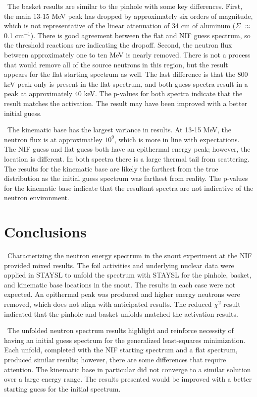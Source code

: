 \documentclass[journal]{IEEEtran}
\begin{document}
	\ The basket results are similar to the pinhole with some key differences. 
First, the main 13-15 MeV peak has dropped by approximately six orders of magnitude, which is not representative of the linear attenuation of 34 cm of aluminum ($\Sigma$ $\approx$ 0.1 cm$^{-1}$). 
There is good agreement between the flat and NIF guess spectrum, so the threshold reactions are indicating the dropoff. 
Second, the neutron flux between approximately one to ten MeV is nearly removed. 
There is not a process that would remove all of the source neutrons in this region, but the result appears for the flat starting spectrum as well. 
The last difference is that the 800 keV peak only is present in the flat spectrum, and both guess spectra result in a peak at approximately 40 keV. 
The p-values for both spectra indicate that the result matches the activation. 
The result may have been improved with a better initial guess. 
	
	\ The kinematic base has the largest variance in results. 
At 13-15 MeV, the neutron flux is at approximatley $10^{9}$, which is more in line with expectations. 
The NIF guess and flat guess both have an epithermal energy peak; however, the location is different. 
In both spectra there is a large thermal tail from scattering. 
The results for the kinematic base are likely the farthest from the true distribution as the initial guess spectrum was farthest from reality. 
The p-values for the kinematic base indicate that the resultant spectra are not indicative of the neutron environment. 
	 
	\section{Conclusions}
	
	\ Characterizing the neutron energy spectrum in the snout experiment at the NIF provided mixed results. 
The foil activities and underlying nuclear data were applied in STAYSL to unfold the spectrum with STAYSL for the pinhole, basket, and kinematic base locations in the snout. 
The results in each case were not expected. 
An epithermal peak was produced and higher energy neutrons were removed, which does not align with anticipated results. 
The reduced $\chi^{2}$  result indicated that the pinhole and basket unfolds matched the activation results. 
	
	\ The unfolded neutron spectrum results highlight and reinforce necessity of having an initial guess spectrum for the generalized least-squares minimization. 
Each unfold, completed with the NIF starting spectrum and a flat spectrum, produced similar results; however, there are some differences that require attention. 
The kinematic base in particular did not converge to a similar solution over a large energy range. 
The results presented would be improved with a better starting guess for the initial spectrum. 
\end{document}
